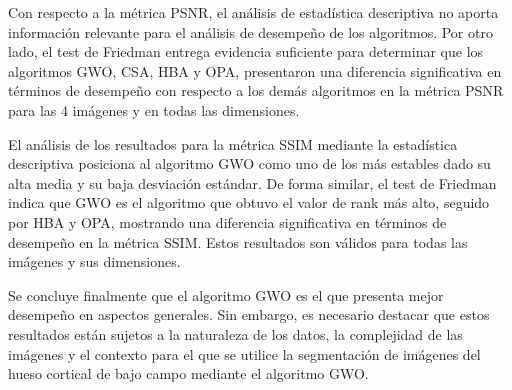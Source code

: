 \documentclass[conference]{IEEEtran}
\begin{document}
\noindent Con respecto a la métrica PSNR, el análisis de estadística descriptiva no aporta información relevante para el análisis de desempeño de los algoritmos. Por otro lado, el test de Friedman entrega evidencia suficiente para determinar que los algoritmos GWO, CSA, HBA y OPA, presentaron una diferencia significativa en términos de desempeño con respecto a los demás algoritmos en la métrica PSNR para las 4 imágenes y en todas las dimensiones.

\noindent El análisis de los resultados para la métrica SSIM mediante la estadística descriptiva posiciona al algoritmo GWO como uno de los más estables dado su alta media y su baja desviación estándar. De forma similar, el test de Friedman indica que GWO es el algoritmo que obtuvo el valor de rank más alto, seguido por HBA y OPA, mostrando una diferencia significativa en términos de desempeño en la métrica SSIM. Estos resultados son válidos para todas las imágenes y sus dimensiones.

\noindent Se concluye finalmente que el algoritmo GWO es el que presenta mejor desempeño en aspectos generales. Sin embargo, es necesario destacar que estos resultados están sujetos a la naturaleza de los datos, la complejidad de las imágenes y el contexto para el que se utilice la segmentación de imágenes del hueso cortical de bajo campo mediante el algoritmo GWO.






 \clearpage



\clearpage
\vspace*{-10pt}
\end{document}
